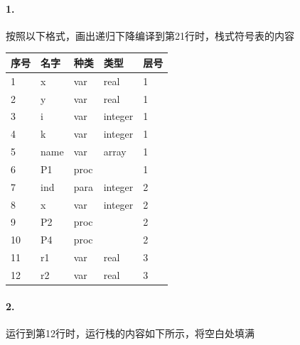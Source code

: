 \documentclass[UTF8]{ctexart} %
\begin{document}
\paragraph{1.} 按照以下格式，画出递归下降编译到第21行时，栈式符号表的内容

\begin{table}[H]
    \centering
    \begin{tabular}{|p{1.5cm}<{\centering}|p{1.5cm}<{\centering}|p{1.5cm}<{\centering}|p{1.5cm}<{\centering}|p{1.5cm}<{\centering}|}
        \hline
        序号 & 名字   & 种类   & 类型      & 层号 \\
        \hline
        1  & x    & var  & real    & 1  \\
        \hline
        2  & y    & var  & real    & 1  \\
        \hline
        3  & i    & var  & integer & 1  \\
        \hline
        4  & k    & var  & integer & 1  \\
        \hline
        5  & name & var  & array   & 1  \\
        \hline
        6  & P1   & proc &         & 1  \\
        \hline
        7  & ind  & para & integer & 2  \\
        \hline
        8  & x    & var  & integer & 2  \\
        \hline
        9  & P2   & proc &         & 2  \\
        \hline
        10 & P4   & proc &         & 2  \\
        \hline
        11 & r1   & var  & real    & 3  \\
        \hline
        12 & r2   & var  & real    & 3  \\
        \hline
    \end{tabular}
\end{table}

\paragraph{2.} 运行到第12行时，运行栈的内容如下所示，将空白处填满
\end{document}
